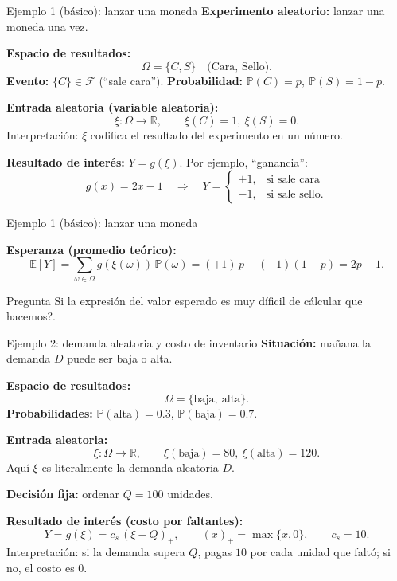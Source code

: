 \documentclass[aspectratio=1610, 9pt]{beamer}
\begin{document}
\begin{frame}{Ejemplo 1 (básico): lanzar una moneda}
\textbf{Experimento aleatorio:} lanzar una moneda una vez.

\medskip
\textbf{Espacio de resultados:}
\[
\Omega=\{C,S\}\quad \text{(Cara, Sello)}.
\]
\textbf{Evento:} $\{C\}\in\mathcal F$ (``sale cara''). \qquad
\textbf{Probabilidad:} $\mathbb P(C)=p,\ \mathbb P(S)=1-p$.

\medskip
\textbf{Entrada aleatoria (variable aleatoria):}
\[
\xi:\Omega\to\mathbb R,\qquad \xi(C)=1,\ \xi(S)=0.
\]
Interpretación: $\xi$ codifica el resultado del experimento en un número.

\medskip
\textbf{Resultado de interés:} $Y=g(\xi)$.
Por ejemplo, ``ganancia'':
\[
g(x)=2x-1\quad \Rightarrow\quad
Y=
\begin{cases}
+1,& \text{si sale cara}\\
-1,& \text{si sale sello}.
\end{cases}
\]

\end{frame}
\begin{frame}{Ejemplo 1 (básico): lanzar una moneda}

\medskip
\textbf{Esperanza (promedio teórico):}
\[
\mathbb E[Y]=\sum_{\omega\in\Omega} g(\xi(\omega))\,\mathbb P(\omega)
=(+1)\,p+(-1)(1-p)=2p-1.
\]

\begin{block}{Pregunta}
Si la expresión del valor esperado es muy díficil de cálcular que hacemos?.
\end{block}
\end{frame}

\begin{frame}{Ejemplo 2:  demanda aleatoria y costo de inventario}
\textbf{Situación:} mañana la demanda $D$ puede ser baja o alta.

\medskip
\textbf{Espacio de resultados:}
\[
\Omega=\{\text{baja},\ \text{alta}\}.
\]
\textbf{Probabilidades:} $\mathbb P(\text{alta})=0.3$, $\mathbb P(\text{baja})=0.7$.

\medskip
\textbf{Entrada aleatoria:}
\[
\xi:\Omega\to\mathbb R,\qquad \xi(\text{baja})=80,\ \xi(\text{alta})=120.
\]
Aquí $\xi$ es literalmente la demanda aleatoria $D$.

\medskip
\textbf{Decisión fija:} ordenar $Q=100$ unidades.

\medskip
\textbf{Resultado de interés (costo por faltantes):}
\[
Y=g(\xi)=c_s\,( \xi - Q )_+,
\qquad (x)_+=\max\{x,0\},\qquad c_s=10.
\]
Interpretación: si la demanda supera $Q$, pagas $10$ por cada unidad que faltó; si no, el costo es 0.
\end{frame}
\end{document}
